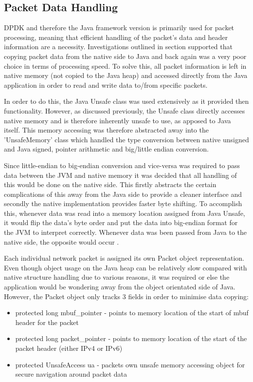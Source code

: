 \documentclass[final_report.tex]{subfiles}
\begin{document}
\subsection{Packet Data Handling}
DPDK and therefore the Java framework version is primarily used for packet processing, meaning that efficient handling of the packet's data and header information are a necessity. Investigations outlined in section  supported that copying packet data from the native side to Java and back again was a very poor choice in terms of processing speed. To solve this, all packet information is left in native memory (not copied to the Java heap) and accessed directly from the Java application in order to read and write data to/from specific packets.

In order to do this, the Java Unsafe class was used extensively as it provided then functionality. However, as discussed previously, the Unsafe class directly accesses native memory and is therefore inherently unsafe to use, as apposed to Java itself. This memory accessing was therefore abstracted away into the 'UnsafeMemory' class which handled the type conversion between native unsigned and Java signed, pointer arithmetic and big/little endian conversion.

Since little-endian to big-endian conversion and vice-versa was required to pass data between the JVM and native memory it was decided that all handling of this would be done on the native side. This firstly abstracts the certain complications of this away from the Java side to provide a cleaner interface and secondly the native implementation provides faster byte shifting. To accomplish this, whenever data was read into a memory location assigned from Java Unsafe, it would flip the data's byte order and put the data into big-endian format for the JVM to interpret correctly. Whenever data was been passed from Java to the native side, the opposite would occur .

Each individual network packet is assigned its own Packet object representation. Even though object usage on the Java heap can be relatively slow compared with native structure handling due to various reasons, it was required or else the application would be wondering away from the object orientated side of Java. However, the Packet object only tracks 3 fields in order to minimise data copying:

\begin{itemize}
	\item protected long mbuf\_pointer - points to memory location of the start of mbuf header for the packet
	\item protected long packet\_pointer - points to memory location of the start of the packet header (either IPv4 or IPv6)
	\item protected UnsafeAccess ua - packets own unsafe memory accessing object for secure navigation around packet data
\end{itemize}
\end{document}
